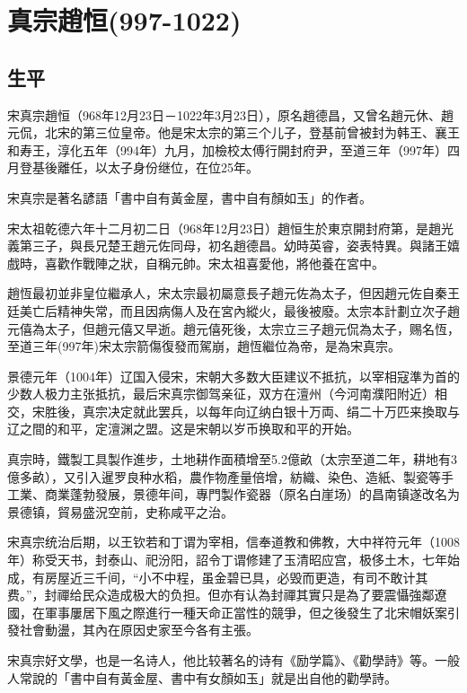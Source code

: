 
\section{真宗趙恒\tiny(997-1022)}

\subsection{生平}

宋真宗趙恒（968年12月23日－1022年3月23日），原名趙德昌，又曾名趙元休、趙元侃，北宋的第三位皇帝。他是宋太宗的第三个儿子，登基前曾被封为韩王、襄王和寿王，淳化五年（994年）九月，加檢校太傅行開封府尹，至道三年（997年）四月登基後離任，以太子身份继位，在位25年。

宋真宗是著名諺語「書中自有黃金屋，書中自有顏如玉」的作者。

宋太祖乾德六年十二月初二日（968年12月23日）趙恒生於東京開封府第，是趙光義第三子，與長兄楚王趙元佐同母，初名趙德昌。幼時英睿，姿表特異。與諸王嬉戲時，喜歡作戰陣之狀，自稱元帥。宋太祖喜愛他，將他養在宮中。

趙恆最初並非皇位繼承人，宋太宗最初屬意長子趙元佐為太子，但因趙元佐自秦王廷美亡后精神失常，而且因病傷人及在宮內縱火，最後被廢。太宗本計劃立次子趙元僖為太子，但趙元僖又早逝。趙元僖死後，太宗立三子趙元侃為太子，赐名恆，至道三年(997年)宋太宗箭傷復發而駕崩，趙恆繼位為帝，是為宋真宗。

景德元年（1004年）辽国入侵宋，宋朝大多数大臣建议不抵抗，以宰相寇準为首的少数人极力主张抵抗，最后宋真宗御驾亲征，双方在澶州（今河南濮阳附近）相交，宋胜後，真宗决定就此罢兵，以每年向辽纳白银十万両、绢二十万匹来換取与辽之間的和平，定澶渊之盟。这是宋朝以岁币换取和平的开始。

真宗時，鐵製工具製作進步，土地耕作面積增至5.2億畝（太宗至道二年，耕地有3億多畝），又引入暹罗良种水稻，農作物產量倍增，紡織、染色、造紙、製瓷等手工業、商業蓬勃發展，景德年间，專門製作瓷器（原名白崖场）的昌南镇遂改名为景德镇，貿易盛況空前，史称咸平之治。

宋真宗统治后期，以王钦若和丁谓为宰相，信奉道教和佛教，大中祥符元年（1008年）称受天书，封泰山、祀汾阳，詔令丁谓修建了玉清昭应宫，极侈土木，七年始成，有房屋近三千间，“小不中程，虽金碧已具，必毁而更造，有司不敢计其费。”，封禪给民众造成极大的负担。但亦有认為封禪其實只是為了要震懾強鄰遼國，在軍事屢居下風之際進行一種天命正當性的競爭，但之後發生了北宋帽妖案引發社會動盪，其內在原因史家至今各有主張。

宋真宗好文學，也是一名诗人，他比较著名的诗有《励学篇》、《勸學詩》等。一般人常說的「書中自有黃金屋、書中有女顏如玉」就是出自他的勸學詩。

